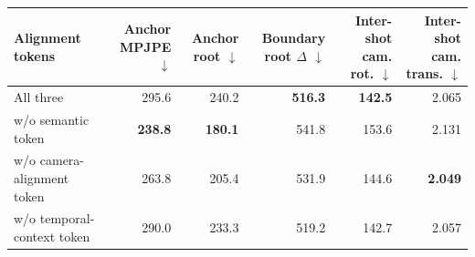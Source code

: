 \begin{tabular}{lrrrrr}
\toprule
Alignment tokens & Anchor MPJPE $\downarrow$ & Anchor root $\downarrow$ & Boundary root $\Delta$ $\downarrow$ & Inter-shot cam. rot. $\downarrow$ & Inter-shot cam. trans. $\downarrow$ \\
\midrule
All three & 295.6 & 240.2 & \textbf{516.3} & \textbf{142.5} & 2.065 \\
w/o semantic token & \textbf{238.8} & \textbf{180.1} & 541.8 & 153.6 & 2.131 \\
w/o camera-alignment token & 263.8 & 205.4 & 531.9 & 144.6 & \textbf{2.049} \\
w/o temporal-context token & 290.0 & 233.3 & 519.2 & 142.7 & 2.057 \\
\bottomrule
\end{tabular}
